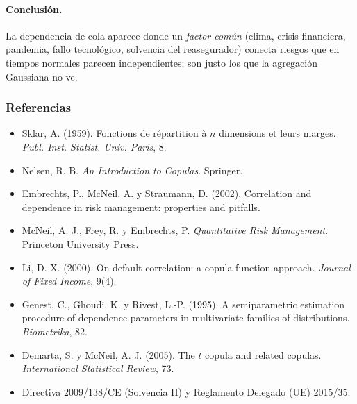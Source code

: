 \documentclass[a4paper,12pt]{article}
\begin{document}
\paragraph{Conclusión.} La dependencia de cola aparece donde un \emph{factor común} (clima, crisis financiera, pandemia, fallo tecnológico, solvencia del reasegurador) conecta riesgos que en tiempos normales parecen independientes; son justo los que la agregación Gaussiana no ve.

\subsubsection*{Referencias}
\begin{itemize}[leftmargin=*,itemsep=0pt]
\item Sklar, A. (1959). Fonctions de r\'epartition \`a $n$ dimensions et leurs marges. \emph{Publ. Inst. Statist. Univ. Paris}, 8.
\item Nelsen, R. B. \emph{An Introduction to Copulas}. Springer.
\item Embrechts, P., McNeil, A. y Straumann, D. (2002). Correlation and dependence in risk management: properties and pitfalls.
\item McNeil, A. J., Frey, R. y Embrechts, P. \emph{Quantitative Risk Management}. Princeton University Press.
\item Li, D. X. (2000). On default correlation: a copula function approach. \emph{Journal of Fixed Income}, 9(4).
\item Genest, C., Ghoudi, K. y Rivest, L.-P. (1995). A semiparametric estimation procedure of dependence parameters in multivariate families of distributions. \emph{Biometrika}, 82.
\item Demarta, S. y McNeil, A. J. (2005). The $t$ copula and related copulas. \emph{International Statistical Review}, 73.
\item Directiva 2009/138/CE (Solvencia II) y Reglamento Delegado (UE) 2015/35.
\end{itemize}
\end{document}
